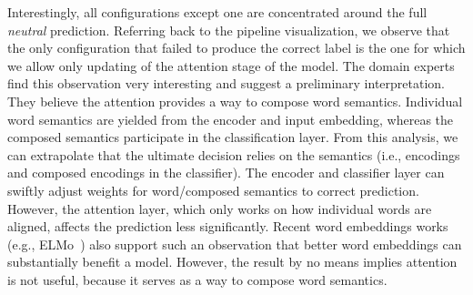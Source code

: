 Interestingly, all configurations except one are concentrated around the full \emph{neutral} prediction. Referring back to the pipeline visualization, we observe that the only configuration that failed to produce the correct label is the one for which we allow only updating of the attention stage of the model.
%
%
The domain experts find this observation very interesting and suggest a preliminary interpretation. They believe the attention provides a way to compose word semantics. Individual word semantics are yielded from the encoder and input embedding, whereas the composed semantics participate in the classification layer. From this analysis, we can extrapolate that the ultimate decision relies on the semantics (i.e., encodings and composed encodings in the classifier). The encoder and classifier layer can swiftly adjust weights for word/composed semantics to correct prediction. However, the attention layer, which only works on how individual words are aligned, affects the prediction less significantly. Recent word embeddings works (e.g., ELMo~\cite{salant2017contextualized}) also support such an observation that better word embeddings can substantially benefit a model. However, the result by no means implies attention is not useful, because it serves as a way to compose word semantics.

